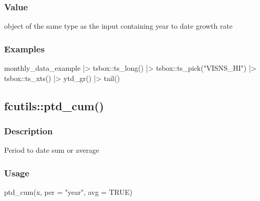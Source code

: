 \documentclass[
  letterpaper,
  DIV=11,
  numbers=noendperiod]{scrreport}
\newenvironment{Shaded}{\begin{snugshade}}{\end{snugshade}}
\newcommand{\AttributeTok}[1]{\textcolor[rgb]{0.40,0.45,0.13}{#1}}
\newcommand{\ConstantTok}[1]{\textcolor[rgb]{0.56,0.35,0.01}{#1}}
\newcommand{\FunctionTok}[1]{\textcolor[rgb]{0.28,0.35,0.67}{#1}}
\newcommand{\NormalTok}[1]{\textcolor[rgb]{0.00,0.23,0.31}{#1}}
\newcommand{\SpecialCharTok}[1]{\textcolor[rgb]{0.37,0.37,0.37}{#1}}
\newcommand{\StringTok}[1]{\textcolor[rgb]{0.13,0.47,0.30}{#1}}
\begin{document}
\subsubsection{Value}\label{value-42}

object of the same type as the input containing year to date growth rate

\subsubsection{Examples}\label{examples-42}

\begin{Shaded}
\begin{Highlighting}[]
\NormalTok{monthly\_data\_example }\SpecialCharTok{|\textgreater{}}
\NormalTok{  tsbox}\SpecialCharTok{::}\FunctionTok{ts\_long}\NormalTok{() }\SpecialCharTok{|\textgreater{}}
\NormalTok{  tsbox}\SpecialCharTok{::}\FunctionTok{ts\_pick}\NormalTok{(}\StringTok{"VISNS\_HI"}\NormalTok{) }\SpecialCharTok{|\textgreater{}}
\NormalTok{  tsbox}\SpecialCharTok{::}\FunctionTok{ts\_xts}\NormalTok{() }\SpecialCharTok{|\textgreater{}}
  \FunctionTok{ytd\_gr}\NormalTok{() }\SpecialCharTok{|\textgreater{}}
  \FunctionTok{tail}\NormalTok{()}
\end{Highlighting}
\end{Shaded}

\subsection{fcutils::ptd\_cum()}\label{fcutilsptd_cum}

\subsubsection{Description}\label{description-43}

Period to date sum or average

\subsubsection{Usage}\label{usage-43}

\begin{Shaded}
\begin{Highlighting}[]
\FunctionTok{ptd\_cum}\NormalTok{(x, }\AttributeTok{per =} \StringTok{"year"}\NormalTok{, }\AttributeTok{avg =} \ConstantTok{TRUE}\NormalTok{)}
\end{Highlighting}
\end{Shaded}
\end{document}
